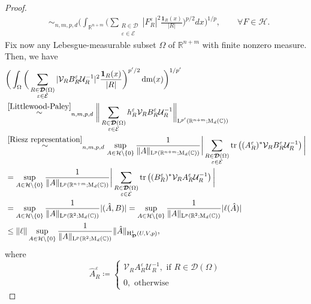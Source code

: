 \documentclass{article}
\theoremstyle{definition}
\theoremstyle{remark}
\numberwithin{equation}{section}
\newcommand{\mathdm}{\,\mathrm{dm}}
\newcommand{\cE}{\mathcal{E}}
\newcommand{\cH}{\mathcal{H}}
\newcommand{\cU}{\mathcal{U}}
\newcommand{\cV}{\mathcal{V}}
\newcommand{\bfD}{\bm{\mathcal{D}}}
\newcommand{\e}{\varepsilon}
\newcommand{\reals}{\mathbb{R}}
\newcommand{\complex}{\mathbb{C}}
\newcommand{\Lp}[1]{\mathrm{L}^{#1}}
\newcommand{\1}{\mathbf{1}}
\newcommand{\tr}{\mathrm{tr}}
\begin{document}
\begin{proof}
\begin{align}
            &\sim_{n,m,p,d}\bigg(\int_{\reals^{n+m}}\bigg(\sum_{\substack{R\in\bfD\\\e\in\cE}}|F_{R}^{\e}|^2\frac{\1_{R}(x)}{|R|}\bigg)^{p/2}dx\bigg)^{1/p},\qquad\forall F\in\cH.
        \end{align}
        Fix now any Lebesgue-measurable subset $\Omega$ of $\reals^{n+m}$ with finite nonzero measure. Then, we have
        \begin{align*}
            &\bigg(\int_{\Omega}\bigg(\sum_{\substack{R\in\bfD(\Omega)\\\e\in\cE}}|\cV_{R}B_{R}^{\e}\cU_{R}^{-1}|^2\frac{\1_{R}(x)}{|R|}\bigg)^{p'/2}\mathdm(x)\bigg)^{1/p'}\\
            &\overset{\eqref{Littlewood-Paley}}{\sim}_{n,m,p,d}\bigg\Vert\sum_{\substack{R\in\bfD(\Omega)\\\e\in\cE}}h_{R}^{\e}\cV_{R}B_{R}^{\e}\cU_{R}^{-1}\bigg\Vert_{\Lp{p'}(\reals^{n+m};\mathrm{M}_{d}(\complex))}\\
            &\overset{\eqref{Riesz representation}}{\sim}_{n,m,p,d}\sup_{A\in\cH\setminus\{0\}}
            \frac{1}{\Vert A\Vert_{\Lp{p}(\reals^{n+m};\mathrm{M}_{d}(\complex))}}\bigg|\sum_{\substack{R\in\bfD(\Omega)\\\e\in\cE}}\tr\left((A_{R}^{\e})^{\ast}\cV_{R}B_{R}^{\e}\cU_{R}^{-1}\right)\bigg|\\
            &=\sup_{A\in\cH\setminus\{0\}}
            \frac{1}{\Vert A\Vert_{\Lp{p}(\reals^{n+m};\mathrm{M}_{d}(\complex))}}\bigg|\sum_{\substack{R\in\bfD(\Omega)\\\e\in\cE}}\tr\left((B_{R}^{\e})^{\ast}\cV_{R}A_{R}^{\e}\cU_{R}^{-1}\right)\bigg|\\
            &=\sup_{A\in\cH\setminus\{0\}}\frac{1}{\Vert A\Vert_{\Lp{p}(\reals^2;\mathrm{M}_{d}(\complex))}}|(\hat{A},B)|=\sup_{A\in\cH\setminus\{0\}}\frac{1}{\Vert A\Vert_{\Lp{p}(\reals^2;\mathrm{M}_{d}(\complex))}}|\ell(\hat{A})|\\
            &\leq\Vert\ell\Vert\sup_{A\in\cH\setminus\{0\}}\frac{1}{\Vert A\Vert_{\Lp{p}(\reals^2;\mathrm{M}_{d}(\complex))}}\Vert\hat{A}\Vert_{\mathrm{H}^1_{\bfD}(U,V,p)},
        \end{align*}
        where
        \begin{equation*}
            \hat{A}^{\e}_{R}\coloneq 
            \begin{cases}
                \cV_{R}A_{R}^{\e}\cU_{R}^{-1},\text{ if } R\in\bfD(\Omega)\\\\
                0,\text{ otherwise}

\end{cases}
\end{equation*}
\end{proof}
\end{document}
